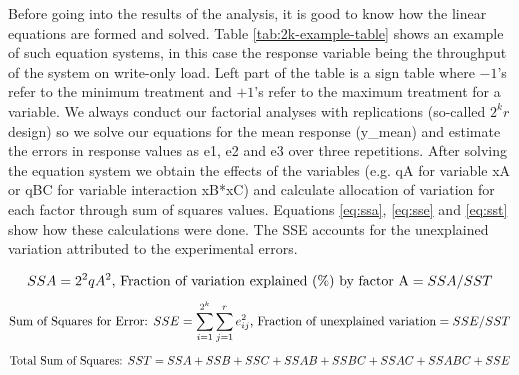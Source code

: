 \documentclass[11pt,a4paper]{article}
\begin{document}
\par Before going into the results of the analysis, it is good to know how the linear equations are formed and solved. Table \ref{tab:2k-example-table} shows an example of such equation systems, in this case the response variable being the throughput of the system on write-only load. Left part of the table is a sign table where $-1$'s refer to the minimum treatment and $+1$'s refer to the maximum treatment for a variable. We always conduct our factorial analyses with replications (so-called $2^{k}r$ design) so we solve our equations for the mean response (y\_mean) and estimate the errors in response values as e1, e2 and e3 over three repetitions. After solving the equation system we obtain the effects of the variables (e.g. qA for variable xA or qBC for variable interaction xB*xC) and calculate allocation of variation for each factor through sum of squares values. Equations \ref{eq:ssa}, \ref{eq:sse} and \ref{eq:sst} show how these calculations were done. The SSE accounts for the unexplained variation attributed to the experimental errors.
\begin{small}
\begin{equation} \label{eq:ssa}
SSA = 2^2 qA^2 \textnormal{, Fraction of variation explained (\%) by factor A} = SSA / SST
\end{equation}
\begin{equation} \label{eq:sse}
\textnormal{Sum of Squares for Error: } SSE = \sum_{i=1}^{2^{k}}\sum_{j=1}^{r} e_{ij}^{2} \textnormal{, Fraction of unexplained variation} = SSE / SST
\end{equation}
\begin{equation} \label{eq:sst}
\textnormal{Total Sum of Squares: } SST = SSA + SSB + SSC + SSAB + SSBC + SSAC + SSABC + SSE
\end{equation}
\end{small}
\end{document}
